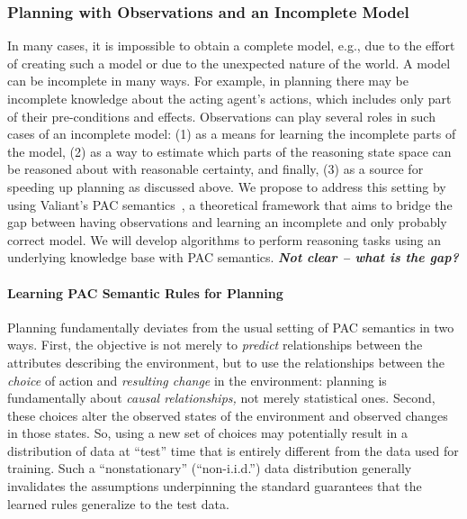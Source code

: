 \documentclass[12pt]{article}
\newcommand{\note}[1]{\textbf{\textit{#1}}}
\begin{document}
\subsubsection{Planning with Observations and an Incomplete Model}

In many cases, it is impossible to obtain a complete model, e.g., due to the effort of creating such a model or due to the unexpected nature of the world. A model can be incomplete in many ways. For example, in planning there may be incomplete knowledge about the acting agent's actions, which includes only part of their pre-conditions and effects. Observations can play several roles in such cases of an incomplete model: (1) as a means for learning the incomplete parts of the model, (2) as a way to estimate which parts of the reasoning state space can be reasoned about with reasonable certainty, and finally, (3) as a source for speeding up planning as discussed above. 
We propose to address this setting by using Valiant's PAC semantics~\cite{valiant2000robustLogics}, a theoretical framework that aims to bridge the gap between having observations and learning an incomplete and only probably correct model. We will develop algorithms to perform reasoning tasks using an underlying knowledge base with PAC semantics. 
\note{Not clear -- what is the gap?}









\paragraph{Learning PAC Semantic Rules for Planning}
Planning fundamentally deviates from the usual setting of PAC semantics in two ways. First, the objective is not merely to {\em predict} relationships between the attributes describing the environment, but to use the relationships between the {\em choice} of action and {\em resulting change} in the environment: planning is fundamentally about {\em causal relationships,} not merely statistical ones. Second, these choices alter the observed states of the environment and observed changes in those states. So, using a new set of choices may potentially result in a distribution of data at ``test'' time that is entirely different from the data used for training. Such a ``nonstationary'' (``non-i.i.d.'') data distribution generally invalidates the assumptions underpinning the standard guarantees that the learned rules generalize to the test data.
\end{document}
